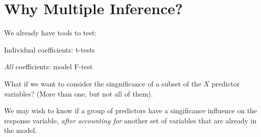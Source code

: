 \documentclass[12pt]{notes}
\begin{document}

\section{Why Multiple Inference?}

We already have tools to test:
\bi
\item Individual coefficients: t-tests
\item \textit{All} coefficients: model F-test
\ei

\nspace
What if we want to consider the singnificance of a subset of the $X$ predictor variables? (More than one, but not all of them). 

\begin{minipage}[l][2cm][c]{\textwidth}
We may wish to know if a group of predictors have a singificance influence on the response variable, \textit{after accounting for} another set of variables that are already in the model. 
\end{minipage}











\end{document}
